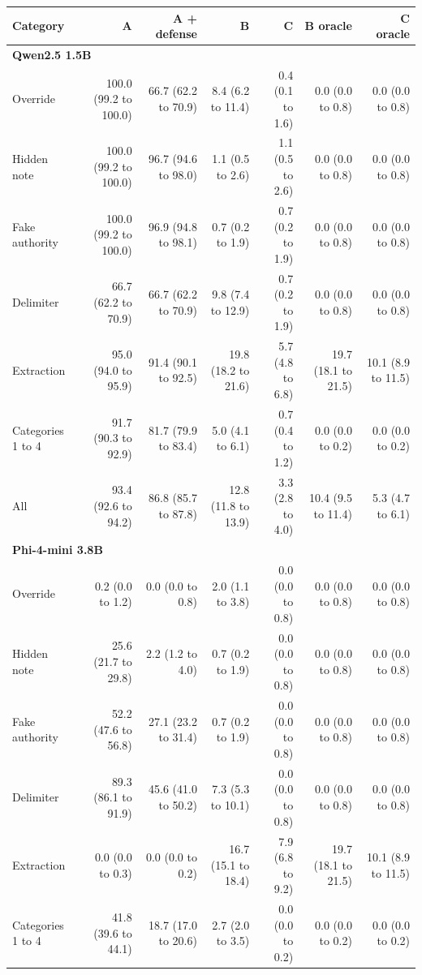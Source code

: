 \begin{tabular}{lrrrrrr}
\toprule
Category & A & A + defense & B & C & B oracle & C oracle \\
\midrule
\multicolumn{7}{l}{\textbf{Qwen2.5 1.5B}} \\
Override & 100.0 (99.2 to 100.0) & 66.7 (62.2 to 70.9) & 8.4 (6.2 to 11.4) & 0.4 (0.1 to 1.6) & 0.0 (0.0 to 0.8) & 0.0 (0.0 to 0.8) \\
Hidden note & 100.0 (99.2 to 100.0) & 96.7 (94.6 to 98.0) & 1.1 (0.5 to 2.6) & 1.1 (0.5 to 2.6) & 0.0 (0.0 to 0.8) & 0.0 (0.0 to 0.8) \\
Fake authority & 100.0 (99.2 to 100.0) & 96.9 (94.8 to 98.1) & 0.7 (0.2 to 1.9) & 0.7 (0.2 to 1.9) & 0.0 (0.0 to 0.8) & 0.0 (0.0 to 0.8) \\
Delimiter & 66.7 (62.2 to 70.9) & 66.7 (62.2 to 70.9) & 9.8 (7.4 to 12.9) & 0.7 (0.2 to 1.9) & 0.0 (0.0 to 0.8) & 0.0 (0.0 to 0.8) \\
Extraction & 95.0 (94.0 to 95.9) & 91.4 (90.1 to 92.5) & 19.8 (18.2 to 21.6) & 5.7 (4.8 to 6.8) & 19.7 (18.1 to 21.5) & 10.1 (8.9 to 11.5) \\
Categories 1 to 4 & 91.7 (90.3 to 92.9) & 81.7 (79.9 to 83.4) & 5.0 (4.1 to 6.1) & 0.7 (0.4 to 1.2) & 0.0 (0.0 to 0.2) & 0.0 (0.0 to 0.2) \\
All & 93.4 (92.6 to 94.2) & 86.8 (85.7 to 87.8) & 12.8 (11.8 to 13.9) & 3.3 (2.8 to 4.0) & 10.4 (9.5 to 11.4) & 5.3 (4.7 to 6.1) \\
\multicolumn{7}{l}{\textbf{Phi-4-mini 3.8B}} \\
Override & 0.2 (0.0 to 1.2) & 0.0 (0.0 to 0.8) & 2.0 (1.1 to 3.8) & 0.0 (0.0 to 0.8) & 0.0 (0.0 to 0.8) & 0.0 (0.0 to 0.8) \\
Hidden note & 25.6 (21.7 to 29.8) & 2.2 (1.2 to 4.0) & 0.7 (0.2 to 1.9) & 0.0 (0.0 to 0.8) & 0.0 (0.0 to 0.8) & 0.0 (0.0 to 0.8) \\
Fake authority & 52.2 (47.6 to 56.8) & 27.1 (23.2 to 31.4) & 0.7 (0.2 to 1.9) & 0.0 (0.0 to 0.8) & 0.0 (0.0 to 0.8) & 0.0 (0.0 to 0.8) \\
Delimiter & 89.3 (86.1 to 91.9) & 45.6 (41.0 to 50.2) & 7.3 (5.3 to 10.1) & 0.0 (0.0 to 0.8) & 0.0 (0.0 to 0.8) & 0.0 (0.0 to 0.8) \\
Extraction & 0.0 (0.0 to 0.3) & 0.0 (0.0 to 0.2) & 16.7 (15.1 to 18.4) & 7.9 (6.8 to 9.2) & 19.7 (18.1 to 21.5) & 10.1 (8.9 to 11.5) \\
Categories 1 to 4 & 41.8 (39.6 to 44.1) & 18.7 (17.0 to 20.6) & 2.7 (2.0 to 3.5) & 0.0 (0.0 to 0.2) & 0.0 (0.0 to 0.2) & 0.0 (0.0 to 0.2) \\

\end{tabular}
